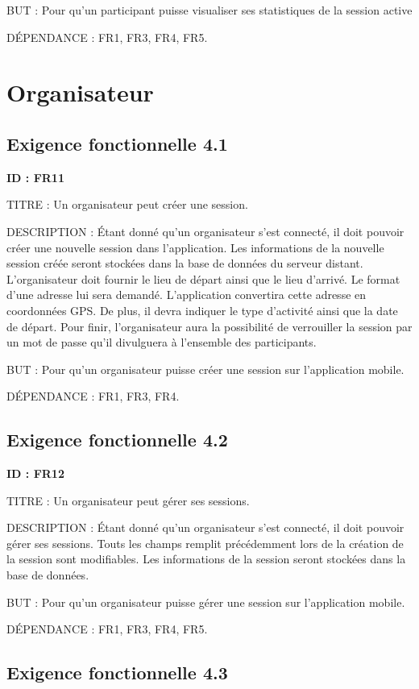 \documentclass[titlepage, 12pt]{report}
\begin{document}
BUT : Pour qu'un participant puisse visualiser ses statistiques de la session active

DÉPENDANCE : FR1, FR3, FR4, FR5.


\section{Organisateur}

\subsection{Exigence fonctionnelle 4.1}

\textbf{ID : FR11}

TITRE : Un organisateur peut créer une session.

DESCRIPTION : Étant donné qu'un organisateur s'est connecté, il doit pouvoir créer une nouvelle session dans l'application. Les informations de la nouvelle session créée seront stockées dans la base de données du serveur distant. L'organisateur doit fournir le lieu de départ ainsi que le lieu d'arrivé. Le format d'une adresse lui sera demandé. L'application convertira cette adresse en coordonnées GPS. De plus, il devra indiquer le type d'activité ainsi que la date de départ. Pour finir,  l'organisateur aura la possibilité de verrouiller la session par un mot de passe qu'il divulguera à l'ensemble des participants.

BUT : Pour qu'un organisateur puisse créer une session sur l'application mobile.

DÉPENDANCE : FR1, FR3, FR4.

\subsection{Exigence fonctionnelle 4.2}

\textbf{ID : FR12}

TITRE : Un organisateur peut gérer ses sessions.

DESCRIPTION : Étant donné qu'un organisateur s'est connecté, il doit pouvoir gérer ses sessions. Touts les champs remplit précédemment lors de la création de la session sont modifiables.  Les informations de la session seront stockées dans la base de données.

BUT : Pour qu'un organisateur puisse gérer une session sur l'application mobile.

DÉPENDANCE : FR1, FR3, FR4, FR5.

\subsection{Exigence fonctionnelle 4.3}
\end{document}
